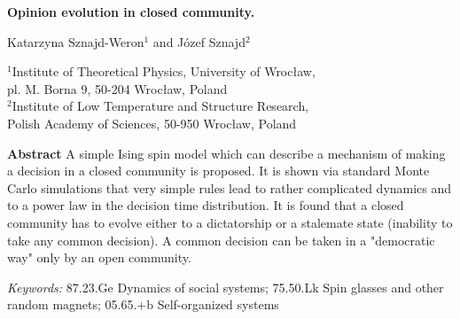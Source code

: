 



\begin{center}

{\bf Opinion evolution in closed community.}
\vspace{0.5cm}

Katarzyna Sznajd-Weron$^1$ and J\'ozef Sznajd$^2$
\vspace{0.5cm}

$^1$Institute of Theoretical Physics, University of Wroc{\l}aw,\\ 
pl. M. Borna 9, 50-204 Wroc{\l}aw, Poland\\
$^2$Institute of Low Temperature and Structure Research,\\ 
Polish Academy of Sciences, 50-950 Wroc{\l}aw, Poland

\end{center}

{\bf Abstract}
A simple Ising spin model which can describe a mechanism of making a decision
in a closed community is proposed. It is shown via standard Monte Carlo
simulations that very simple rules lead to rather complicated dynamics and to
a power law in the decision time distribution. It is found that a closed
community has to evolve either to a dictatorship or a stalemate
state (inability to take any common decision). A common decision can be
taken in a "democratic way" only by an open community.

\vspace{0.5cm}

{\it Keywords:} 87.23.Ge Dynamics of social systems; 
75.50.Lk Spin glasses and other random magnets;
05.65.+b Self-organized systems

